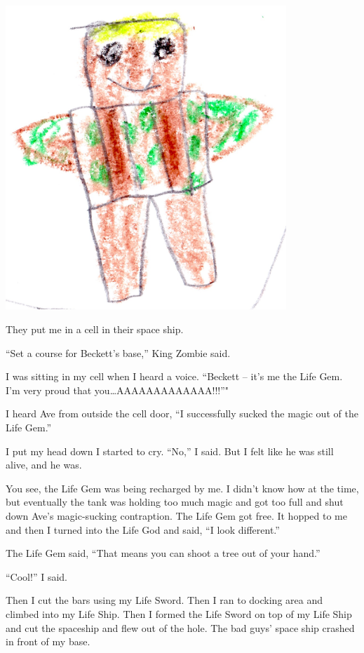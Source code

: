 \documentclass[12pt,twoside]{krantz}
\begin{document}
\includegraphics[width=4.16667in,height=\textheight]{img/four-bad-guys/lifegod.jpg}

They put me in a cell in their space ship.

``Set a course for Beckett's base,'' King Zombie said.

I was sitting in my cell when I heard a voice. ``Beckett -- it's me the
Life Gem. I'm very proud that you\ldots{}AAAAAAAAAAAAA!!!''"

I heard Ave from outside the cell door, ``I successfully sucked the
magic out of the Life Gem.''

I put my head down I started to cry. ``No,'' I said. But I felt like he
was still alive, and he was.

You see, the Life Gem was being recharged by me. I didn't know how at
the time, but eventually the tank was holding too much magic and got too
full and shut down Ave's magic-sucking contraption. The Life Gem got
free. It hopped to me and then I turned into the Life God and said, ``I
look different.''

The Life Gem said, ``That means you can shoot a tree out of your hand.''

``Cool!'' I said.

Then I cut the bars using my Life Sword. Then I ran to docking area and
climbed into my Life Ship. Then I formed the Life Sword on top of my
Life Ship and cut the spaceship and flew out of the hole. The bad guys'
space ship crashed in front of my base.
\end{document}

